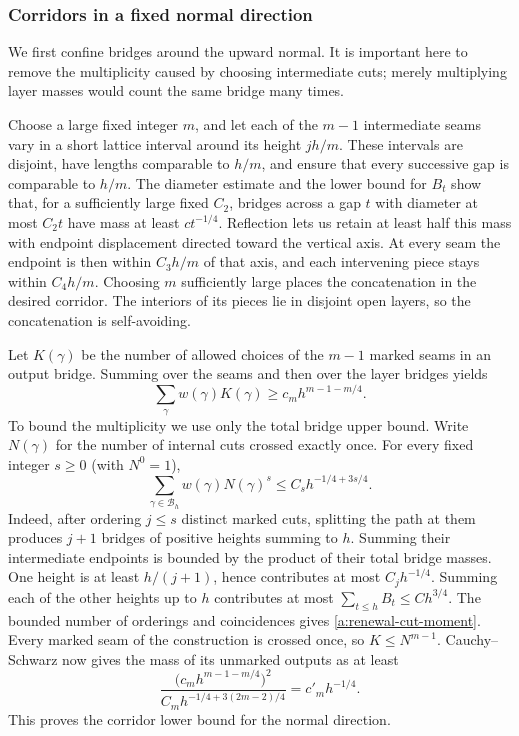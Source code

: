 \subsubsection{Corridors in a fixed normal direction}
We first confine bridges around the upward normal. It is important here
to remove the multiplicity caused by choosing intermediate cuts; merely
multiplying layer masses would count the same bridge many times.

Choose a large fixed integer $m$, and let each of the $m-1$ intermediate
seams vary in a short lattice interval around its height $jh/m$. These
intervals are disjoint, have lengths comparable to $h/m$, and ensure
that every successive gap is comparable to $h/m$. The diameter estimate
and the lower bound for $B_t$ show that, for a sufficiently large fixed
$C_2$, bridges across a gap $t$ with diameter at most $C_2t$ have mass at
least $c t^{-1/4}$. Reflection lets us retain at least half this mass with
endpoint displacement directed toward the vertical axis. At every seam
the endpoint is then within $C_3h/m$ of that axis, and each intervening
piece stays within $C_4h/m$. Choosing $m$ sufficiently large places the
concatenation in the desired corridor. The interiors of its pieces lie
in disjoint open layers, so the concatenation is self-avoiding.

Let $K(\gamma)$ be the number of allowed choices of the $m-1$ marked
seams in an output bridge. Summing over the seams and then over the
layer bridges yields
\[
 \sum_\gamma w(\gamma)K(\gamma)
       \ge c_m h^{m-1-m/4}.
\]
To bound the multiplicity we use only the total bridge upper bound.
Write $N(\gamma)$ for the number of internal cuts crossed exactly once.
For every fixed integer $s\ge0$ (with $N^0=1$),
\begin{equation}\label{a:renewal-cut-moment}
 \sum_{\gamma\in\mathcal B_h}w(\gamma)N(\gamma)^s
                         \le C_s h^{-1/4+3s/4}.
\end{equation}
Indeed, after ordering $j\le s$ distinct marked cuts, splitting the path
at them produces $j+1$ bridges of positive heights summing
to $h$. Summing their intermediate endpoints is bounded by the product
of their total bridge masses. One height is at least $h/(j+1)$, hence contributes at most
$C_jh^{-1/4}$. Summing each of the other heights up to $h$ contributes
at most $\sum_{t\le h}B_t\le Ch^{3/4}$. The bounded number of orderings
and coincidences gives \eqref{a:renewal-cut-moment}. Every marked seam
of the construction is crossed once, so $K\le N^{m-1}$.
Cauchy--Schwarz now gives the mass of its unmarked outputs as at least
\[
 \frac{\bigl(c_mh^{m-1-m/4}\bigr)^2}
      {C_mh^{-1/4+3(2m-2)/4}}=c'_m h^{-1/4}.
\]
This proves the corridor lower bound for the normal direction.

